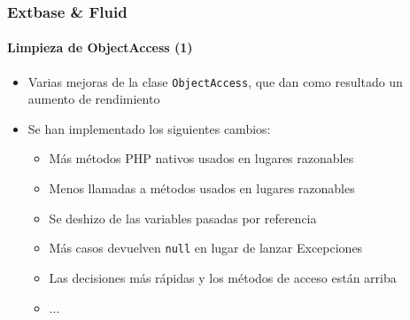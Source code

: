 
\begin{frame}[fragile]
	\frametitle{Extbase \& Fluid}
	\framesubtitle{Limpieza de ObjectAccess (1)}

	\begin{itemize}

		\item Varias mejoras de la clase \texttt{ObjectAccess}, que dan como resultado un aumento de rendimiento
		\item Se han implementado los siguientes cambios:

			\begin{itemize}
				\item Más métodos PHP nativos usados en lugares razonables
				\item Menos llamadas a métodos usados en lugares razonables
				\item Se deshizo de las variables pasadas por referencia
				\item Más casos devuelven \texttt{null} en lugar de lanzar Excepciones
				\item Las decisiones más rápidas y los métodos de acceso están arriba
				\item ...
			\end{itemize}

	\end{itemize}

\end{frame}


